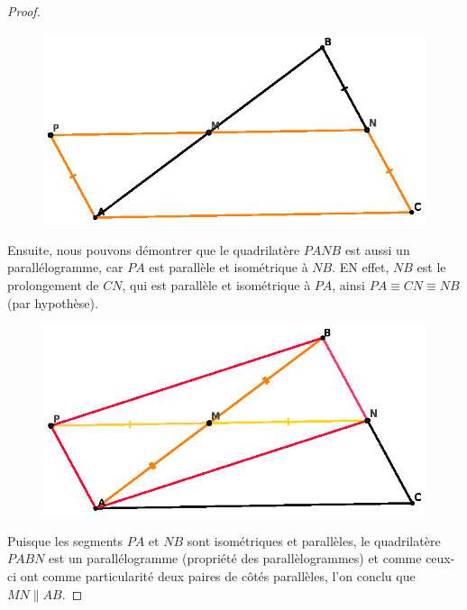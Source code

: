 \documentclass[a4paper,12pt]{article}
\begin{document}
\begin{proof}
\begin{figure}[H]
        \centering
        \includegraphics[scale=1.3]{segmentMoyen2.eps}
    \end{figure}

Ensuite, nous pouvons démontrer que le quadrilatère $PANB$ est aussi un parallélogramme, car $PA$ est parallèle et isométrique à $NB$. EN effet, $NB$ est le prolongement de $CN$, qui est parallèle et isométrique à $PA$, ainsi $PA \equiv CN \equiv NB$ (par hypothèse). 

\begin{figure}[H]
        \centering
        \includegraphics[scale=1.3]{segmentMoyen3.eps}
    \end{figure}

Puisque les segments $PA$ et $NB$ sont isométriques et parallèles, le quadrilatère $PABN$ est un parallélogramme (propriété des parallèlogrammes) et comme ceux-ci ont comme particularité deux paires de côtés parallèles, l'on conclu que $MN \parallel AB$.


\end{proof}
\end{document}

